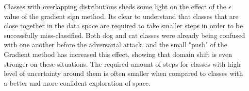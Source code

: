Classes with overlapping distributions sheds some light on the effect of the $\epsilon$ value of the gradient sign method. Its clear to understand that classes that are close together in the data space are required to take smaller steps in order to be successfully miss-classified. Both dog and cat classes were already being confused with one another before the adversarial attack, and the small "push" of the Gradient method has increased this effect, showing that domain shift is even stronger on these situations. The required amount of steps for classes with high level of uncertainty around them is often smaller when compared to classes with a better and more confident exploration of space.